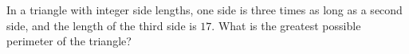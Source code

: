 In a triangle with integer side lengths, one side is three times as long as a second side, and the length of the third side is $17$. What is the greatest possible perimeter of the triangle?
